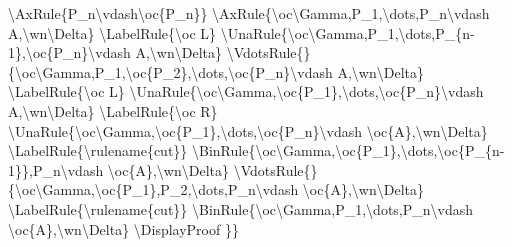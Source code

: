 \textbackslash{}AxRule\{P\_n\textbackslash{}vdash\textbackslash{}oc\{P\_n\}\}
\textbackslash{}AxRule\{\textbackslash{}oc\textbackslash{}Gamma,P\_1,\textbackslash{}dots,P\_n\textbackslash{}vdash
A,\textbackslash{}wn\textbackslash{}Delta\}
\textbackslash{}LabelRule\{\textbackslash{}oc L\}
\textbackslash{}UnaRule\{\textbackslash{}oc\textbackslash{}Gamma,P\_1,\textbackslash{}dots,P\_\{n-1\},\textbackslash{}oc\{P\_n\}\textbackslash{}vdash
A,\textbackslash{}wn\textbackslash{}Delta\}
\textbackslash{}VdotsRule\{\}\{\textbackslash{}oc\textbackslash{}Gamma,P\_1,\textbackslash{}oc\{P\_2\},\textbackslash{}dots,\textbackslash{}oc\{P\_n\}\textbackslash{}vdash
A,\textbackslash{}wn\textbackslash{}Delta\}
\textbackslash{}LabelRule\{\textbackslash{}oc L\}
\textbackslash{}UnaRule\{\textbackslash{}oc\textbackslash{}Gamma,\textbackslash{}oc\{P\_1\},\textbackslash{}dots,\textbackslash{}oc\{P\_n\}\textbackslash{}vdash
A,\textbackslash{}wn\textbackslash{}Delta\}
\textbackslash{}LabelRule\{\textbackslash{}oc R\}
\textbackslash{}UnaRule\{\textbackslash{}oc\textbackslash{}Gamma,\textbackslash{}oc\{P\_1\},\textbackslash{}dots,\textbackslash{}oc\{P\_n\}\textbackslash{}vdash
\textbackslash{}oc\{A\},\textbackslash{}wn\textbackslash{}Delta\}
\textbackslash{}LabelRule\{\textbackslash{}rulename\{cut\}\}
\textbackslash{}BinRule\{\textbackslash{}oc\textbackslash{}Gamma,\textbackslash{}oc\{P\_1\},\textbackslash{}dots,\textbackslash{}oc\{P\_\{n-1\}\},P\_n\textbackslash{}vdash
\textbackslash{}oc\{A\},\textbackslash{}wn\textbackslash{}Delta\}
\textbackslash{}VdotsRule\{\}\{\textbackslash{}oc\textbackslash{}Gamma,\textbackslash{}oc\{P\_1\},P\_2,\textbackslash{}dots,P\_n\textbackslash{}vdash
\textbackslash{}oc\{A\},\textbackslash{}wn\textbackslash{}Delta\}
\textbackslash{}LabelRule\{\textbackslash{}rulename\{cut\}\}
\textbackslash{}BinRule\{\textbackslash{}oc\textbackslash{}Gamma,P\_1,\textbackslash{}dots,P\_n\textbackslash{}vdash
\textbackslash{}oc\{A\},\textbackslash{}wn\textbackslash{}Delta\}
\textbackslash{}DisplayProof \}\}

